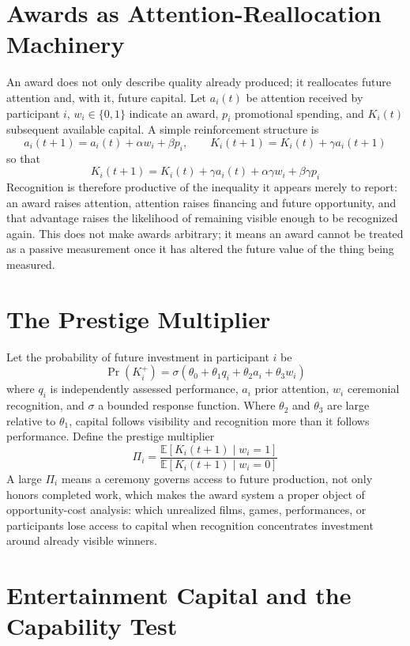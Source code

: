 \documentclass[11pt]{article}
\begin{document}
\section{Awards as Attention-Reallocation Machinery}

An award does not only describe quality already produced; it reallocates future attention and, with it, future capital. Let $a_i(t)$ be attention received by participant $i$, $w_i \in \{0,1\}$ indicate an award, $p_i$ promotional spending, and $K_i(t)$ subsequent available capital. A simple reinforcement structure is
\[
a_i(t+1) = a_i(t) + \alpha w_i + \beta p_i, \qquad K_i(t+1) = K_i(t) + \gamma a_i(t+1)
\]
so that
\[
K_i(t+1) = K_i(t) + \gamma a_i(t) + \alpha\gamma w_i + \beta\gamma p_i
\]
Recognition is therefore productive of the inequality it appears merely to report: an award raises attention, attention raises financing and future opportunity, and that advantage raises the likelihood of remaining visible enough to be recognized again. This does not make awards arbitrary; it means an award cannot be treated as a passive measurement once it has altered the future value of the thing being measured.

\section{The Prestige Multiplier}

Let the probability of future investment in participant $i$ be
\[
\Pr(K_i^{+}) = \sigma(\theta_0 + \theta_1 q_i + \theta_2 a_i + \theta_3 w_i)
\]
where $q_i$ is independently assessed performance, $a_i$ prior attention, $w_i$ ceremonial recognition, and $\sigma$ a bounded response function. Where $\theta_2$ and $\theta_3$ are large relative to $\theta_1$, capital follows visibility and recognition more than it follows performance. Define the prestige multiplier
\[
\Pi_i = \frac{\mathbb{E}[K_i(t+1) \mid w_i = 1]}{\mathbb{E}[K_i(t+1) \mid w_i = 0]}
\]
A large $\Pi_i$ means a ceremony governs access to future production, not only honors completed work, which makes the award system a proper object of opportunity-cost analysis: which unrealized films, games, performances, or participants lose access to capital when recognition concentrates investment around already visible winners.

\section{Entertainment Capital and the Capability Test}
\end{document}
